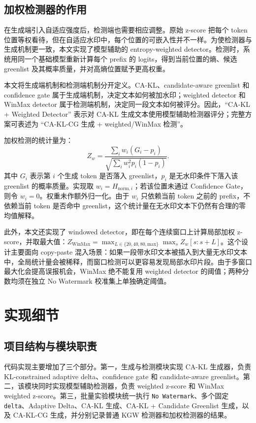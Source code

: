 \documentclass[a4paper,UTF8,zihao=5]{ctexart}
\newcommand{\method}{CA-KL}
\newcommand{\fullmethod}{CA-KL-CG}
\begin{document}
\subsection{加权检测器的作用}

在生成端引入自适应强度后，检测端也需要相应调整。原始 z-score 把每个 token 位置等权看待，但在自适应水印中，每个位置的可嵌入性并不一样。为使检测器与生成机制更一致，本文实现了模型辅助的 entropy-weighted detector。检测时，系统用同一个基础模型重新计算每个 prefix 的 logits，得到当前位置的熵、候选 greenlist 及其概率质量，并对高熵位置赋予更高权重。

本文将生成端机制和检测端机制分开定义。\method{}、candidate-aware greenlist 和 confidence gate 属于生成端机制，决定文本如何被加水印；weighted detector 和 WinMax detector 属于检测端机制，决定同一段文本如何被评分。因此，``\method{} + Weighted Detector'' 表示对 \method{} 生成文本使用模型辅助检测器评分；完整方案可表述为 ``\fullmethod{} 生成 + weighted/WinMax 检测''。

加权检测的统计量为：
\[
    Z_w=\frac{\sum_i w_i(G_i-p_i)}
    {\sqrt{\sum_i w_i^2p_i(1-p_i)}}.
\]
其中 $G_i$ 表示第 $i$ 个生成 token 是否落入 greenlist，$p_i$ 是无水印条件下落入该 greenlist 的概率质量。实现取 $w_i=H_{\mathrm{norm},i}$；若该位置未通过 Confidence Gate，则令 $w_i=0$。权重未作额外归一化。由于 $w_i$ 只依赖当前 token 之前的 prefix，不依赖当前 token 是否命中 greenlist，这个统计量在无水印文本下仍然有合理的零均值解释。

此外，本文还实现了 windowed detector，即在每个连续窗口上计算局部加权 z-score，并取最大值：$Z_{\mathrm{WinMax}}=\max_{L\in\{20,40,80,\mathrm{max}\}}\max_s Z_w[s:s+L]$。这个设计主要面向 copy-paste 混入场景：如果一段带水印文本被插入到大量无水印文本中，全局统计量会被稀释，而窗口检测可以更容易发现局部水印片段。由于多窗口最大化会提高误报机会，WinMax 绝不能复用 weighted detector 的阈值；两种分数均须在独立 No Watermark 校准集上单独确定阈值。

\section{实现细节}

\subsection{项目结构与模块职责}

代码实现主要增加了三个部分。第一，生成与检测模块实现 CA-KL 生成器，负责 KL-constrained adaptive delta、confidence gate 和 candidate-aware greenlist。第二，该模块同时实现模型辅助检测器，负责 weighted z-score 和 WinMax weighted z-score。第三，批量实验模块统一执行 \texttt{No Watermark}、多个固定 \texttt{delta}、Adaptive Delta、\method{} 生成、\method{} + Candidate Greenlist 生成，以及 \fullmethod{} 生成，并分别记录普通 KGW 检测器和加权检测器的结果。
\end{document}
